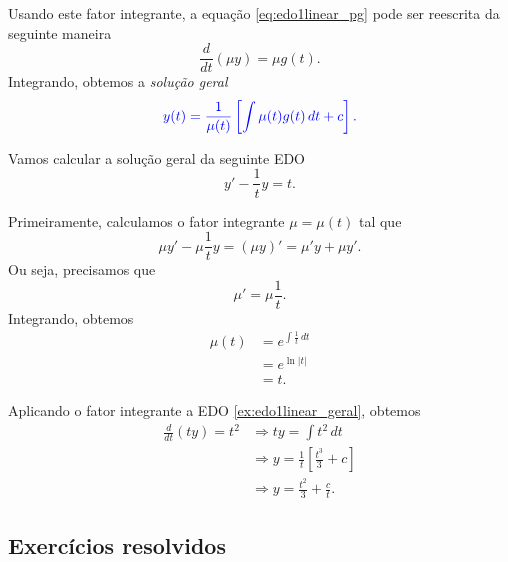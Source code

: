 Usando este fator integrante, a equação \eqref{eq:edo1linear_pg} pode ser reescrita da seguinte maneira
\begin{equation}
  \frac{d}{dt}\left(\mu y\right) = \mu g(t).
\end{equation}
Integrando, obtemos a \emph{solução geral}
\begin{equation}
  \color{blue}{y(t) = \frac{1}{\mu(t)}\left[\int \mu(t) g(t)\,dt + c\right].}
\end{equation}

\begin{ex}
  Vamos calcular a solução geral da seguinte EDO
  \begin{equation}\label{ex:edo1linear_geral}
    y' - \frac{1}{t}y = t.
  \end{equation}

  Primeiramente, calculamos o fator integrante $\mu = \mu(t)$ tal que
  \begin{equation}
    \mu y' - \mu \frac{1}{t} y = (\mu y)' = \mu'y + \mu y'.
  \end{equation}
  Ou seja, precisamos que
  \begin{equation}
    \mu' = \mu \frac{1}{t}.
  \end{equation}
  Integrando, obtemos
  \begin{align}
    \mu(t) &= e^{\int \frac{1}{t}\,dt} \\
           &= e^{\ln|t|} \\
           &= t.
  \end{align}

  Aplicando o fator integrante a EDO \eqref{ex:edo1linear_geral}, obtemos
  \begin{align}
    \frac{d}{dt}\left(t y\right) = t^2 &\Rightarrow ty = \int t^2\,dt \\
                                       &\Rightarrow y = \frac{1}{t}\left[\frac{t^3}{3} + c\right] \\
                                       &\Rightarrow y = \frac{t^2}{3} + \frac{c}{t}.
  \end{align}
\end{ex}

\subsection*{Exercícios resolvidos}

